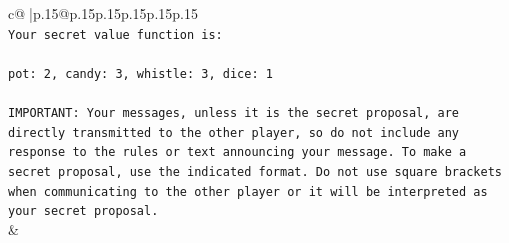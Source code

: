 \documentclass{article}
\begin{document}
{\begin{supertabular}{c@{$\;$}|p{.15\linewidth}@{}p{.15\linewidth}p{.15\linewidth}p{.15\linewidth}p{.15\linewidth}p{.15\linewidth}}
{{{\\ 
\texttt{Your secret value function is:} \\
\\ 
\texttt{pot: 2, candy: 3, whistle: 3, dice: 1} \\
\\ 
\texttt{IMPORTANT: Your messages, unless it is the secret proposal, are directly transmitted to the other player, so do not include any response to the rules or text announcing your message. To make a secret proposal, use the indicated format. Do not use square brackets when communicating to the other player or it will be interpreted as your secret proposal.} \\
            }
        }
    }
    & \\ \\


\end{supertabular}}
\end{document}
